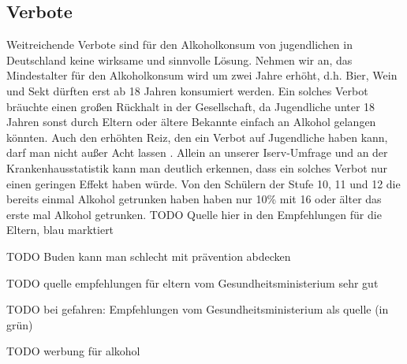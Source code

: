 \documentclass[12pt]{article}
\begin{document}
\subsection{Verbote}
Weitreichende Verbote sind für den Alkoholkonsum von jugendlichen in Deutschland keine wirksame und sinnvolle Lösung. Nehmen wir an, das Mindestalter für den Alkoholkonsum wird um zwei Jahre erhöht, d.h. Bier, Wein und Sekt dürften erst ab 18 Jahren konsumiert werden. Ein solches Verbot bräuchte einen großen Rückhalt in der Gesellschaft, da Jugendliche unter 18 Jahren sonst durch Eltern oder ältere Bekannte einfach an Alkohol gelangen könnten. Auch den erhöhten Reiz, den ein Verbot auf Jugendliche haben kann, darf man nicht außer Acht lassen \autocite{skala_jugend_2020}. 
Allein an unserer Iserv-Umfrage und an der Krankenhausstatistik kann man deutlich erkennen, dass ein solches Verbot nur einen geringen Effekt haben würde. Von den Schülern der Stufe 10, 11 und 12 die bereits einmal Alkohol getrunken haben haben nur 10\% mit 16 oder älter das erste mal Alkohol getrunken. 
TODO Quelle hier in den Empfehlungen für die Eltern, blau marktiert


TODO Buden kann man schlecht mit prävention abdecken


TODO quelle empfehlungen für eltern vom Gesundheitsministerium sehr gut

TODO bei gefahren: Empfehlungen vom Gesundheitsministerium als quelle (in grün)

TODO werbung für alkohol
\printbibliography
\end{document}
